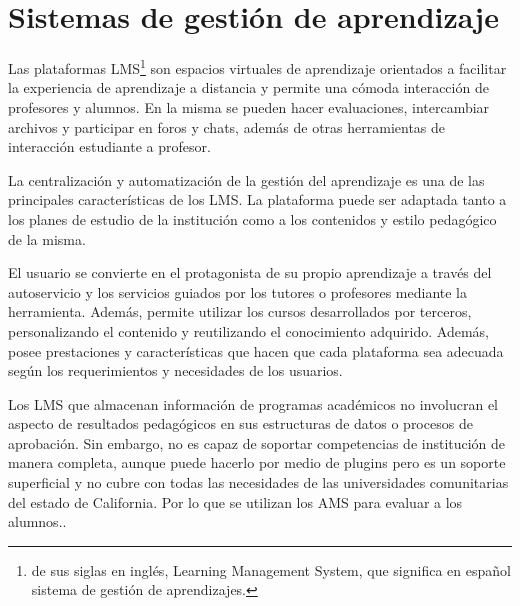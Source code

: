 \section{Sistemas de gestión de aprendizaje}
Las plataformas LMS\footnote{de sus siglas en inglés, Learning Management System, que significa en español sistema de gestión de aprendizajes.} son espacios virtuales de aprendizaje orientados a facilitar la experiencia de aprendizaje a distancia y permite una cómoda interacción de profesores y alumnos. En la misma se pueden hacer evaluaciones, intercambiar archivos y participar en foros y chats, además de otras herramientas de interacción estudiante a profesor.

La centralización y automatización de la gestión del aprendizaje es una de las principales características de los LMS. La plataforma puede ser adaptada tanto a los planes de estudio de la institución como a los contenidos y estilo pedagógico de la misma.

El usuario se convierte en el protagonista de su propio aprendizaje a través del autoservicio y los servicios guiados por los tutores o profesores mediante la herramienta. Además, permite utilizar los cursos desarrollados por terceros, personalizando el contenido y reutilizando el conocimiento adquirido. Además, posee prestaciones y características que hacen que cada plataforma sea adecuada según los requerimientos y necesidades de los usuarios.

Los LMS que almacenan información de programas académicos no involucran el aspecto de resultados pedagógicos en sus estructuras de datos o procesos de aprobación. Sin embargo, no es capaz de soportar competencias de institución de manera completa, aunque puede hacerlo por medio de plugins pero es un soporte superficial y no cubre con todas las necesidades de las universidades comunitarias del estado de California. Por lo que se utilizan los AMS para evaluar a los alumnos.\citep{aalst_workflow_2004}.